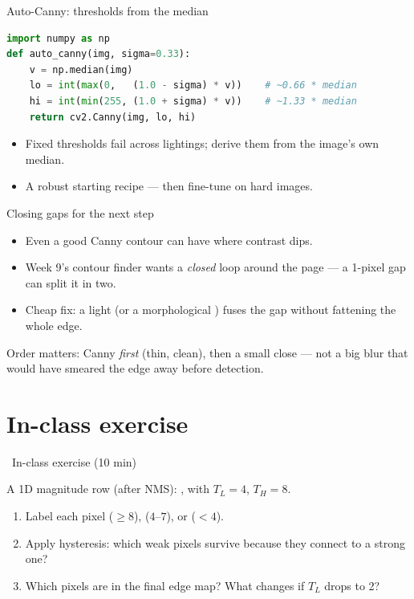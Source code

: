 \documentclass[10pt,aspectratio=169]{beamer}
\begin{document}
\begin{frame}[fragile]{Auto-Canny: thresholds from the median}
\begin{lstlisting}[language=Python]
import numpy as np
def auto_canny(img, sigma=0.33):
    v = np.median(img)
    lo = int(max(0,   (1.0 - sigma) * v))    # ~0.66 * median
    hi = int(min(255, (1.0 + sigma) * v))    # ~1.33 * median
    return cv2.Canny(img, lo, hi)
\end{lstlisting}
  \begin{itemize}
    \item Fixed thresholds fail across lightings; derive them from the image's own median.
    \item A robust starting recipe — then fine-tune  on hard images.
  \end{itemize}
\end{frame}

\begin{frame}{Closing gaps for the next step}
  \begin{itemize}
    \item Even a good Canny contour can have  where contrast dips.
    \item Week 9's contour finder wants a \emph{closed} loop around the page — a 1-pixel gap can split it in two.
    \item Cheap fix: a light  (or a morphological ) fuses the gap without fattening the whole edge.
  \end{itemize}
  \begin{goodbox}
    Order matters: Canny \emph{first} (thin, clean), then a small close — not a big blur that would
    have smeared the edge away before detection.
  \end{goodbox}
\end{frame}

\section{In-class exercise}

\begin{frame}{\faPen~In-class exercise (10 min)}
  \begin{infobox}
  \end{infobox}
  A 1D magnitude row (after NMS): \code{[2, 9, 5, 4, 6, 10, 1]}, with $T_L=4$, $T_H=8$.
  \begin{enumerate}
    \item Label each pixel  ($\geq 8$),  ($4\text{--}7$), or  ($<4$).
    \item Apply hysteresis: which weak pixels survive because they connect to a strong one?
    \item Which pixels are in the final edge map? What changes if $T_L$ drops to 2?
  \end{enumerate}
\end{frame}
\end{document}
